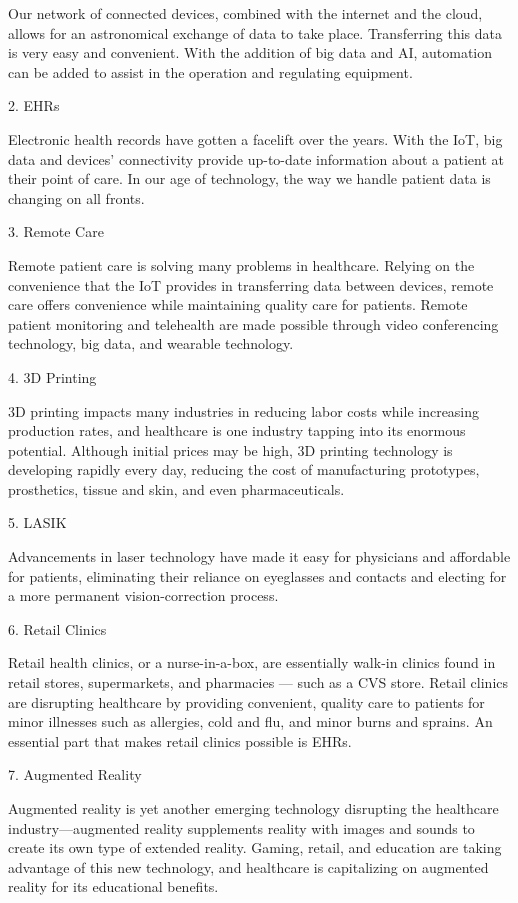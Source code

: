 \documentclass[11pt]{article}
\begin{document}
Our network of connected devices, combined with the internet and the cloud, allows for an astronomical exchange of data to take place. Transferring this data is very easy and convenient. With the addition of big data and AI, automation can be added to assist in the operation and regulating equipment.

2. EHRs

Electronic health records have gotten a facelift over the years. With the IoT, big data and devices’ connectivity provide up-to-date information about a patient at their point of care. In our age of technology, the way we handle patient data is changing on all fronts.

3. Remote Care

Remote patient care is solving many problems in healthcare. Relying on the convenience that the IoT provides in transferring data between devices, remote care offers convenience while maintaining quality care for patients. Remote patient monitoring and telehealth are made possible through video conferencing technology, big data, and wearable technology.

4. 3D Printing

3D printing impacts many industries in reducing labor costs while increasing production rates, and healthcare is one industry tapping into its enormous potential. Although initial prices may be high, 3D printing technology is developing rapidly every day, reducing the cost of manufacturing prototypes, prosthetics, tissue and skin, and even pharmaceuticals.

5. LASIK

Advancements in laser technology have made it easy for physicians and affordable for patients, eliminating their reliance on eyeglasses and contacts and electing for a more permanent vision-correction process. 

6. Retail Clinics

Retail health clinics, or a nurse-in-a-box, are essentially walk-in clinics found in retail stores, supermarkets, and pharmacies — such as a CVS store. Retail clinics are disrupting healthcare by providing convenient, quality care to patients for minor illnesses such as allergies, cold and flu, and minor burns and sprains. An essential part that makes retail clinics possible is EHRs.

7. Augmented Reality

Augmented reality is yet another emerging technology disrupting the healthcare industry—augmented reality supplements reality with images and sounds to create its own type of extended reality. Gaming, retail, and education are taking advantage of this new technology, and healthcare is capitalizing on augmented reality for its educational benefits.
\end{document}
